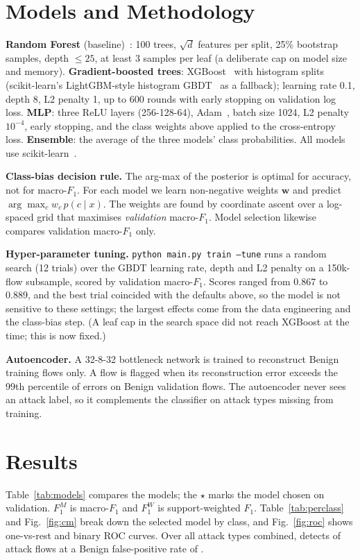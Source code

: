 \documentclass[conference]{IEEEtran}
\begin{document}
\section{Models and Methodology}
\textbf{Random Forest} (baseline)~\cite{breiman2001}: 100 trees,
$\sqrt{d}$ features per split, 25\% bootstrap samples, depth $\le 25$, at
least 3 samples per leaf (a deliberate cap on model size and memory).
\textbf{Gradient-boosted trees}: XGBoost~\cite{chen2016} with histogram
splits (scikit-learn's LightGBM-style histogram GBDT~\cite{ke2017} as a
fallback); learning rate 0.1, depth 8, L2 penalty 1, up to 600 rounds with
early stopping on validation log loss. \textbf{MLP}: three ReLU layers (256-128-64), Adam~\cite{kingma2015},
batch size 1024, L2 penalty $10^{-4}$, early stopping, and the class weights
above applied to the cross-entropy loss. \textbf{Ensemble}: the average of the
three models' class probabilities. All models use
scikit-learn~\cite{pedregosa2011}.

\textbf{Class-bias decision rule.} The arg-max of the posterior is optimal
for accuracy, not for macro-$F_1$. For each model we learn non-negative weights
$\mathbf{w}$ and predict $\arg\max_c w_c\,p(c\mid x)$. The weights are found
by coordinate ascent over a log-spaced grid that maximises
\emph{validation} macro-$F_1$. Model selection likewise compares validation
macro-$F_1$ only.

\textbf{Hyper-parameter tuning.} \texttt{python main.py train --tune} runs a
random search (12 trials) over the GBDT learning rate, depth and L2 penalty
on a 150k-flow subsample, scored by validation macro-$F_1$. Scores ranged from
0.867 to 0.889, and the best trial coincided with the defaults above, so the
model is not sensitive to these settings; the largest effects come from the
data engineering and the class-bias step. (A leaf cap in the search space did
not reach XGBoost at the time; this is now fixed.)

\textbf{Autoencoder.} A 32-8-32 bottleneck network is trained to reconstruct
Benign training flows only. A flow is flagged when its reconstruction error
exceeds the 99th percentile of errors on Benign validation flows. The
autoencoder never sees an attack label, so it complements the classifier on
attack types missing from training.

\section{Results}
Table~\ref{tab:models} compares the models; the $\star$ marks the model chosen
on validation. $F_1^M$ is macro-$F_1$ and $F_1^W$ is support-weighted $F_1$.
Table~\ref{tab:perclass} and Fig.~\ref{fig:cm} break down the selected model
by class, and Fig.~\ref{fig:roc} shows one-vs-rest and binary ROC curves.
Over all attack types combined, \BestModel{} detects \DetectionRate{} of
attack flows at a Benign false-positive rate of \FalsePositiveRate{}.
\end{document}
